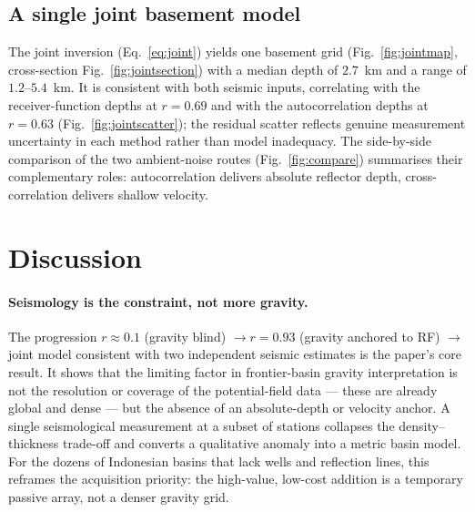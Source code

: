 \subsection{A single joint basement model}
The joint inversion (Eq.~\ref{eq:joint}) yields one basement grid
(Fig.~\ref{fig:jointmap}, cross-section Fig.~\ref{fig:jointsection}) with a median
depth of $2.7$~km and a range of $1.2$--$5.4$~km. It is consistent with both
seismic inputs, correlating with the receiver-function depths at $r=0.69$ and with
the autocorrelation depths at $r=0.63$ (Fig.~\ref{fig:jointscatter}); the residual
scatter reflects genuine measurement uncertainty in each method rather than model
inadequacy. The side-by-side comparison of the two ambient-noise routes
(Fig.~\ref{fig:compare}) summarises their complementary roles: autocorrelation
delivers absolute reflector depth, cross-correlation delivers shallow velocity.

\section{Discussion}
\paragraph{Seismology is the constraint, not more gravity.}
The progression $r\approx0.1$ (gravity blind) $\rightarrow r=0.93$ (gravity
anchored to RF) $\rightarrow$ joint model consistent with two independent seismic
estimates is the paper's core result. It shows that the limiting factor in
frontier-basin gravity interpretation is not the resolution or coverage of the
potential-field data --- these are already global and dense --- but the absence of
an absolute-depth or velocity anchor. A single seismological measurement at a
subset of stations collapses the density--thickness trade-off and converts a
qualitative anomaly into a metric basin model. For the dozens of Indonesian
basins that lack wells and reflection lines, this reframes the acquisition
priority: the high-value, low-cost addition is a temporary passive array, not a
denser gravity grid.


